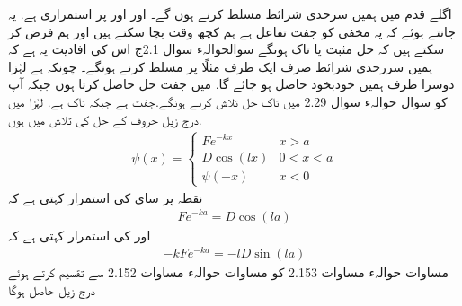  اگلے قدم میں ہمیں سرحدی شرائط مسلط کرنے ہوں گے۔ اور   اور  پر استمراری ہے. یہ جانتے ہوئے کہ یہ مخفی کو جفت تفاعل ہے ہم کچھ وقت بچا سکتے ہیں اور ہم فرض کر سکتے ہیں کہ حل مثبت یا تاک ہوںگے سوالحوالہء{ سوال 2.1ج   }
اس کی افادیت یہ  ہے کہ ہمیں سررحدی شرائط صرف ایک طرف مثلًا پر مسلط کرنے ہونگے۔
 چونکہ ہے لہٰزا دوسرا  طرف ہمیں خودبخود حاصل ہو جائے گا. میں جفت حل حاصل کرتا ہوں جبکہ آپ کو سوال حوالہء{  سوال 2.29  }میں تاک  حل تلاش کرنے ہونگے.جفت ہے جبکہ تاک ہے. لہٰزا میں درج زیل حروف کے حل کی تلاش میں ہوں. 
\begin{align}
\psi(x)=
\begin{cases}
Fe^{-kx} & x> a\\
D\cos(lx) & 0< x < a\\
\psi(-x) & x< 0
\end{cases}
\end{align}
نقطہ پر سای کی استمرار کہتی ہے کہ 
\begin{align} Fe^{-ka}=D\cos(la) \end{align}
 اور  کی استمرار کہتی ہے کہ
 \begin{align}-kFe^{-ka}=-lD\sin(la) \end{align} 
 مساوات حوالہء{ مساوات 2.153   } کو مساوات حوالہء{  مساوات 2.152  } سے تقسیم کرتے ہوئے درج زیل حاصل ہوگا

